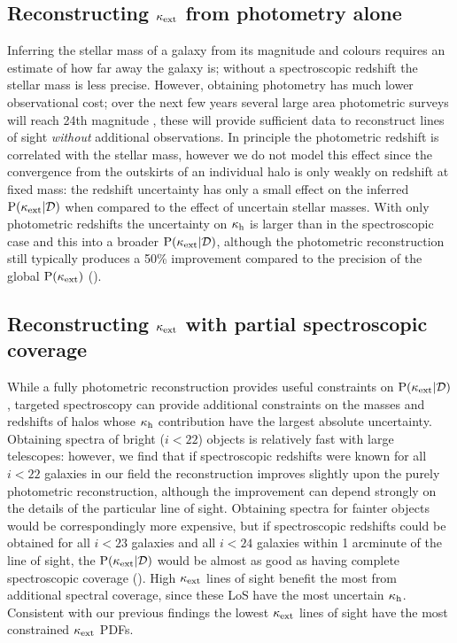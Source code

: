 \documentclass[useAMS,usenatbib,a4paper]{mn2e}
\begin{document}
%

\subsection{Reconstructing $\kappa_{\rm ext}$ from photometry alone}

Inferring the stellar mass of a galaxy from its magnitude and colours requires
an estimate of how far away the galaxy is; without a spectroscopic redshift
the \infered stellar mass is less precise. However, obtaining photometry has
much lower observational cost; over the next few years several large area
photometric surveys will reach 24th magnitude \citep{Euclid,LSST}, these will
provide sufficient data to reconstruct lines of sight {\it without} additional
observations. In principle the photometric redshift is correlated with the
\infered stellar mass, however we do not model this effect since the
convergence from the outskirts of an individual halo is only weakly \dependant
on redshift at fixed mass: the redshift uncertainty has only a small effect on the
inferred ${\rm P}(\kappa_{\rm ext}|{\mathcal{D}})$ when compared to the effect of uncertain stellar
masses.  With only photometric redshifts the uncertainty on
$\kappa_{\rm h}$ is larger than in the spectroscopic case and this
\propogates into a broader ${\rm P}(\kappa_{\rm ext}|{\mathcal{D}})$, although the photometric
reconstruction still typically produces a 50\% improvement compared to the
precision of the global ${\rm P}(\kappa_{\rm ext})$ ().


\subsection{Reconstructing $\kappa_{\rm ext}$ with partial spectroscopic coverage}

While a fully photometric reconstruction provides useful constraints on
${\rm P}(\kappa_{\rm ext}|{\mathcal{D}})$, targeted spectroscopy can provide additional constraints
on the masses and redshifts of halos whose $\kappa_{\rm h}$ contribution have the
largest absolute uncertainty. Obtaining spectra of bright ($i<22$) objects is
relatively fast with large telescopes: however, we find that if spectroscopic
redshifts were known for all $i<22$ galaxies in our field the reconstruction
improves slightly upon the purely photometric reconstruction, although the
improvement can depend strongly on the details of the particular line of
sight. Obtaining spectra for fainter objects would be correspondingly more
expensive, but if spectroscopic redshifts could be obtained for all $i<23$
galaxies and all $i<24$ galaxies within 1 arcminute of the line of sight, the
${\rm P}(\kappa_{\rm ext}|{\mathcal{D}})$ would be almost as good as having complete spectroscopic
coverage (). High $\kappa_{\rm ext}$ lines of sight benefit the
most from additional spectral coverage, since these LoS have the most
uncertain $\kappa_{\rm h}$. Consistent with our previous findings the lowest $\kappa_{\rm ext}$
lines of sight have the most constrained $\kappa_{\rm ext}$ PDFs.
\end{document}
